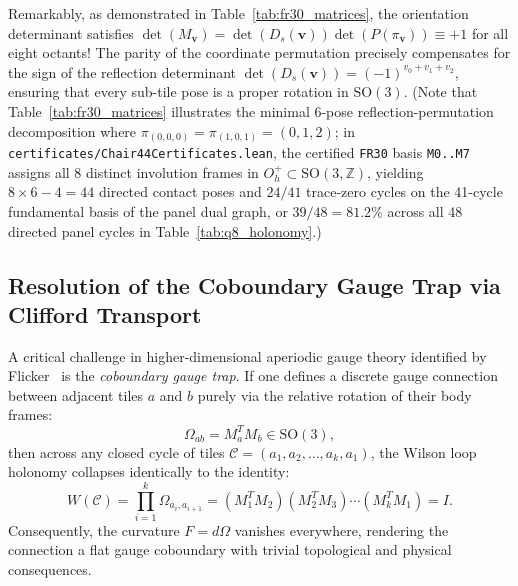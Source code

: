 \documentclass[11pt,a4paper]{article}
\theoremstyle{definition}
\newcommand{\Z}{\mathbb{Z}}
\newcommand{\SO}{\mathrm{SO}}
\begin{document}
Remarkably, as demonstrated in Table~\ref{tab:fr30_matrices}, the orientation determinant satisfies $\det(M_{\mathbf{v}}) = \det(D_s(\mathbf{v})) \det(P(\pi_{\mathbf{v}})) \equiv +1$ for all eight octants! The parity of the coordinate permutation precisely compensates for the sign of the reflection determinant $\det(D_s(\mathbf{v})) = (-1)^{v_0+v_1+v_2}$, ensuring that every sub-tile pose is a proper rotation in $\SO(3)$. (Note that Table~\ref{tab:fr30_matrices} illustrates the minimal 6-pose reflection-permutation decomposition where $\pi_{(0,0,0)}=\pi_{(1,0,1)}=(0,1,2)$; in \texttt{certificates/Chair44Certificates.lean}, the certified \texttt{FR30} basis \texttt{M0..M7} assigns all 8 distinct involution frames in $O_h^+\subset\SO(3,\Z)$, yielding $8\times 6 - 4 = 44$ directed contact poses and $24/41$ trace-zero cycles on the 41-cycle fundamental basis of the panel dual graph, or $39/48 = 81.2\%$ across all 48 directed panel cycles in Table~\ref{tab:q8_holonomy}.)

\subsection{Resolution of the Coboundary Gauge Trap via Clifford Transport}

A critical challenge in higher-dimensional aperiodic gauge theory identified by Flicker~\cite{Flicker2026} is the \textit{coboundary gauge trap}. If one defines a discrete gauge connection between adjacent tiles $a$ and $b$ purely via the relative rotation of their body frames:
\begin{equation}
\Omega_{ab} = M_a^T M_b \in \SO(3),
\end{equation}
then across any closed cycle of tiles $\mathcal{C} = (a_1, a_2, \dots, a_k, a_1)$, the Wilson loop holonomy collapses identically to the identity:
\begin{equation}
W(\mathcal{C}) = \prod_{i=1}^k \Omega_{a_i, a_{i+1}} = (M_1^T M_2)(M_2^T M_3)\cdots (M_k^T M_1) = I.
\end{equation}
Consequently, the curvature $F = d\Omega$ vanishes everywhere, rendering the connection a flat gauge coboundary with trivial topological and physical consequences.
\end{document}
